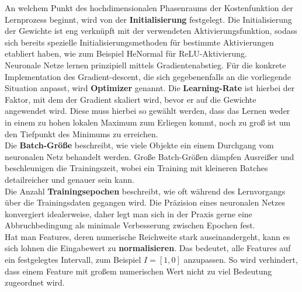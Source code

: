 \newline
An welchem Punkt des hochdimensionalen Phasenraums der Kostenfunktion der Lernprozess beginnt, wird von der \textbf{Initialisierung} festgelegt. Die Initialisierung der Gewichte ist eng verknüpft mit der verwendeten Aktivierungsfunktion, sodass sich bereits spezielle Initialisierungsmethoden für bestimmte Aktivierungen etabliert haben, wie zum Beispiel HeNormal für ReLU-Aktivierung. \\
\newline
Neuronale Netze lernen prinzipiell mittels Gradientenabstieg. Für die konkrete Implementation des Gradient-descent, die sich gegebenenfalls an die vorliegende Situation anpasst, wird \textbf{Optimizer} genannt. Die \textbf{Learning-Rate} ist hierbei der Faktor, mit dem der Gradient skaliert wird, bevor er auf die Gewichte angewendet wird. Diese muss hierbei so gewählt werden, dass das Lernen weder in einem zu hohen lokalen Maximum zum Erliegen kommt, noch zu groß ist um den Tiefpunkt des Minimums zu erreichen. \\
\newline
Die \textbf{Batch-Größe} beschreibt, wie viele Objekte ein einem Durchgang vom neuronalen Netz behandelt werden. Große Batch-Größen dämpfen Ausreißer und beschleunigen die Trainingszeit, wobei ein Training mit kleineren Batches detailreicher und genauer sein kann. \\ 
\newline
Die Anzahl \textbf{Trainingsepochen} beschreibt, wie oft während des Lernvorgangs über die Trainingsdaten gegangen wird. Die Präzision eines neuronalen Netzes konvergiert idealerweise, daher legt man sich in der Praxis gerne eine Abbruchbedingung als minimale Verbesserung zwischen Epochen fest. \\
\newline
Hat man Features, deren numerische Reichweite stark auseinandergeht, kann es sich lohnen die Eingabewert zu \textbf{normalisieren}. Das bedeutet, alle Features auf ein festgelegtes Intervall, zum Beispiel $I=[1,0]$ anzupassen. So wird verhindert, dass einem Feature mit großem numerischen Wert nicht zu viel Bedeutung zugeordnet wird.\\

